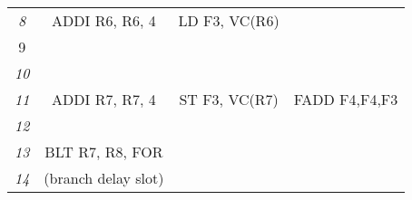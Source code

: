 \begin{enumerate}
\begin{table}[H]
\begin{tabular}{c|ccc}
            \textit{8}           & ADDI R6, R6, 4       & LD F3, VC(R6)        &                 \\
            9                    &                      &                      &                 \\
            \textit{10}          &                      &                      &                 \\
            \textit{11}          & ADDI R7, R7, 4       & ST F3, VC(R7)        & FADD F4,F4,F3   \\
            \textit{12}          &                      &                      &                 \\
            \textit{13}          & BLT R7, R8, FOR      &                      &                 \\
            \textit{14}          & (branch delay slot)  &                      &                
            \end{tabular}
        \end{table}
\end{enumerate}